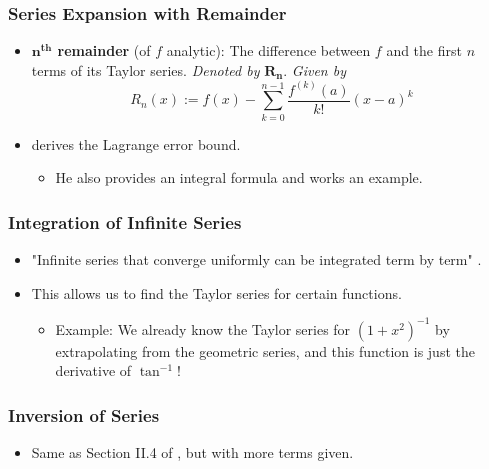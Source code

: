\documentclass[../finalProject.tex]{subfiles}
\begin{document}
\subsubsection{Series Expansion with Remainder}
\begin{itemize}
    \item \textbf{$\bm{n}^\textbf{th}$ remainder} (of $f$ analytic): The difference between $f$ and the first $n$ terms of its Taylor series. \emph{Denoted by} $\bm{R_n}$. \emph{Given by}
    \begin{equation*}
        R_n(x) := f(x)-\sum_{k=0}^{n-1}\frac{f^{(k)}(a)}{k!}(x-a)^k
    \end{equation*}
    \item \textcite{bib:Seaborn} derives the Lagrange error bound.
    \begin{itemize}
        \item He also provides an integral formula and works an example.
    \end{itemize}
\end{itemize}

\subsubsection{Integration of Infinite Series}
\begin{itemize}
    \item "Infinite series that converge uniformly can be integrated term by term" \parencite[22]{bib:Seaborn}.
    \item This allows us to find the Taylor series for certain functions.
    \begin{itemize}
        \item Example: We already know the Taylor series for $(1+x^2)^{-1}$ by extrapolating from the geometric series, and this function is just the derivative of $\tan^{-1}$!
    \end{itemize}
\end{itemize}

\subsubsection{Inversion of Series}
\begin{itemize}
    \item Same as Section II.4 of \textcite{bib:FischerLieb}, but with more terms given.
\end{itemize}
\end{document}
